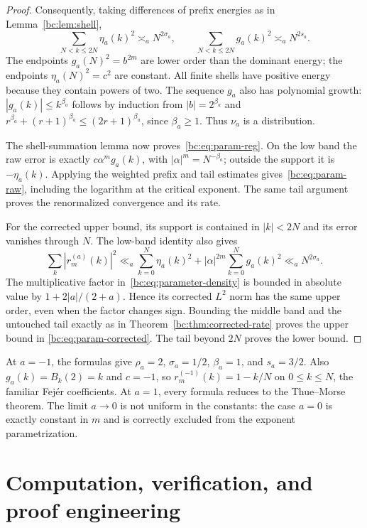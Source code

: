 \documentclass[11pt,a4paper,oneside,openany]{book}
\numberwithin{equation}{chapter}
\theoremstyle{definition}
\theoremstyle{remark}
\begin{document}
\begin{proof}
Consequently, taking differences of prefix energies as in
Lemma~\ref{bc:lem:shell},
\[
 \sum_{N<k\le2N}\eta_a(k)^2\asymp_a N^{2\sigma_a},\qquad
 \sum_{N<k\le2N}g_a(k)^2\asymp_a N^{2s_a}.
\]
The endpoints $g_a(N)^2=b^{2m}$ are lower order than the dominant energy;
the endpoints $\eta_a(N)^2=c^2$ are constant. All finite shells have positive
energy because they contain powers of two. The sequence $g_a$ also has
polynomial growth: $|g_a(k)|\le k^{\beta_a}$ follows by induction from
$|b|=2^{\beta_a}$ and
$r^{\beta_a}+(r+1)^{\beta_a}\le(2r+1)^{\beta_a}$, since $\beta_a\ge1$.
Thus $\nu_a$ is a distribution.

The shell-summation lemma now proves~\eqref{bc:eq:param-reg}. On the low band the
raw error is exactly $c\alpha^mg_a(k)$, with
$|\alpha|^m=N^{-\beta_a}$; outside the support it is $-\eta_a(k)$. Applying
the weighted prefix and tail estimates gives~\eqref{bc:eq:param-raw}, including
the logarithm at the critical exponent. The same tail argument proves the
renormalized convergence and its rate.

For the corrected upper bound, its support is contained in $|k|<2N$ and its
error vanishes through $N$. The low-band identity also gives
\[
 \sum_k|r_m^{(a)}(k)|^2
 \ll_a \sum_{k=0}^{N}\eta_a(k)^2+
        |\alpha|^{2m}\sum_{k=0}^{N}g_a(k)^2
 \ll_a N^{2\sigma_a}.
\]
The multiplicative factor in~\eqref{bc:eq:parameter-density} is bounded in absolute
value by $1+2|a|/(2+a)$. Hence its corrected $L^2$ norm has the same upper order,
even when the factor changes sign. Bounding the middle band and the untouched
tail exactly as in Theorem~\ref{bc:thm:corrected-rate} proves the upper bound in
\eqref{bc:eq:param-corrected}. The tail beyond $2N$ proves the lower bound.
\end{proof}

At $a=-1$, the formulas give $\rho_a=2$, $\sigma_a=1/2$, $\beta_a=1$, and
$s_a=3/2$. Also $g_a(k)=B_k(2)=k$ and $c=-1$, so
$r_m^{(-1)}(k)=1-k/N$ on $0\le k\le N$, the familiar Fej\'er coefficients.
At $a=1$, every formula reduces to the Thue--Morse theorem. The limit $a\to0$
is not uniform in the constants: the case $a=0$ is exactly constant in $m$ and
is correctly excluded from the exponent parametrization.
\chapter{Computation, verification, and proof engineering}
\label{bc:sec:computation}
\end{document}
